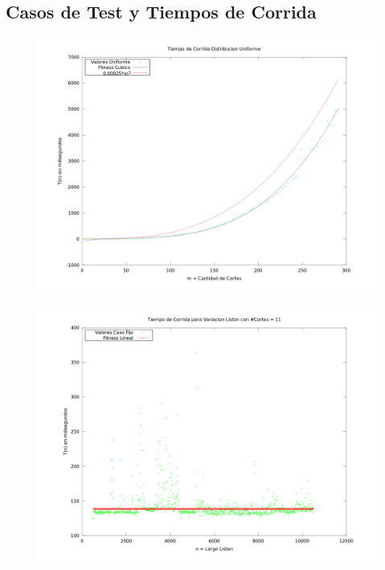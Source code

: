 \newpage

\subsection{Casos de Test y Tiempos de Corrida}

\begin{figure}[h]
\centering                                                       
        \includegraphics[width=320pt]{./figs/Ej3DU.png}
	\label{fig:ej3DU}
\end{figure}

\begin{figure}[h]
\centering                                                       
        \includegraphics[width=320pt]{./figs/Ej3CF.png}
	\label{fig:ej3CF}
\end{figure}

\newpage

